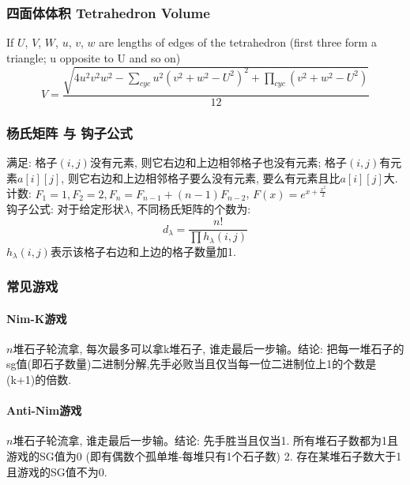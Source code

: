 \begin{small}
\subsubsection{四面体体积 Tetrahedron Volume}
If $U$, $V$, $W$, $u$, $v$, $w$ are lengths of edges of the tetrahedron (first three form a triangle; u opposite to U and so on)
\[ V = \frac{\sqrt{ 4u^2v^2w^2 - \sum_{cyc}{u^2(v^2+w^2-U^2)^2} + \prod_{cyc}{(v^2+w^2-U^2)} }}{12} \]
\subsubsection{杨氏矩阵 与 钩子公式}
满足: 格子$(i,j)$没有元素, 则它右边和上边相邻格子也没有元素; 格子$(i,j)$有元素$a[i][j]$, 则它右边和上边相邻格子要么没有元素, 要么有元素且比$a[i][j]$大.\\
计数: $F_1=1,F_2=2,F_n=F_{n-1}+(n-1)F_{n-2}$, $F(x)=e^{x+\frac{x^2}{2}}$\\
钩子公式: 对于给定形状$\lambda$, 不同杨氏矩阵的个数为:
\[d_\lambda=\frac{n!}{\prod h_\lambda(i,j)}\]
$h_\lambda(i,j)$表示该格子右边和上边的格子数量加1. 

\subsubsection{常见游戏}
\begin{multicols}{2}
\paragraph{Nim-K游戏}$n$堆石子轮流拿, 每次最多可以拿k堆石子, 谁走最后一步输。结论: 把每一堆石子的sg值(即石子数量)二进制分解,先手必败当且仅当每一位二进制位上1的个数是(k+1)的倍数. 
\paragraph{Anti-Nim游戏}$n$堆石子轮流拿, 谁走最后一步输。结论: 先手胜当且仅当1. 所有堆石子数都为1且游戏的SG值为0 (即有偶数个孤单堆-每堆只有1个石子数) 2. 存在某堆石子数大于1且游戏的SG值不为0.

\end{multicols}
\end{small}
